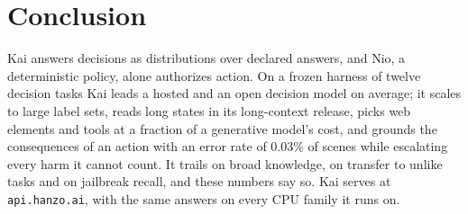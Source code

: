 \section{Conclusion}
\label{sec:conclusion}

Kai answers decisions as distributions over declared answers, and Nio, a
deterministic policy, alone authorizes action. On a frozen harness of twelve
decision tasks Kai leads a hosted and an open decision model on average; it
scales to large label sets, reads long states in its long-context release,
picks web elements and tools at a fraction of a generative model's cost, and
grounds the consequences of an action with an error rate of 0.03\% of scenes
while escalating every harm it cannot count. It trails on broad knowledge, on
transfer to unlike tasks and on jailbreak recall, and these numbers say so.
Kai serves at \texttt{api.hanzo.ai}, with the same answers on every CPU family
it runs on.
